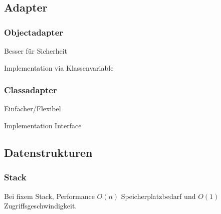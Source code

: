 \subsection{Adapter}
\subsubsection{Objectadapter}

Besser für Sicherheit

Implementation via Klassenvariable

\subsubsection{Classadapter}

Einfacher/Flexibel

Implementation Interface

\subsection{Datenstrukturen}

\subsubsection{Stack}

Bei fixem Stack, Performance $O(n)$ Speicherplatzbedarf und $O(1)$ Zugriffsgeschwindigkeit.

